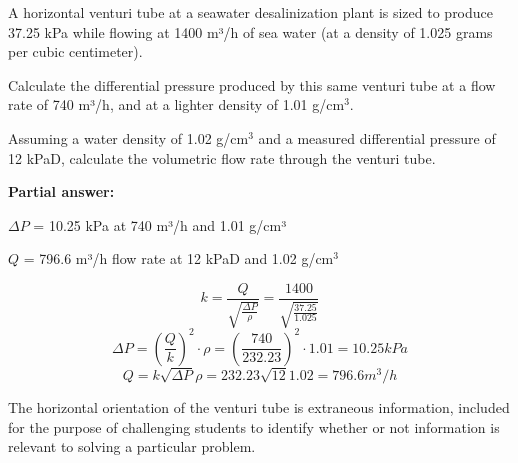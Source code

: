 
A horizontal venturi tube at a seawater desalinization plant is sized to produce 37.25 kPa while flowing at 1400 m³/h of sea water (at a density of 1.025 grams per cubic centimeter).

\vskip 10pt

Calculate the differential pressure produced by this same venturi tube at a flow rate of 740 m³/h, and at a lighter density of 1.01 g/cm$^{3}$.

\vskip 10pt



Assuming a water density of 1.02 g/cm$^{3}$ and a measured differential pressure of 12 kPaD, calculate the volumetric flow rate through the venturi tube.

%







\noindent
{\bf Partial answer:}

\vskip 10pt

$\Delta P$ = 10.25 kPa at 740 m³/h and 1.01 g/cm³


\vskip 10pt

$Q$ = 796.6 m³/h flow rate at 12 kPaD and 1.02 g/cm$^{3}$






$$k=\frac{Q}{\sqrt{\frac{\Delta P}{\rho}}}=\frac{1400}{\sqrt{\frac{37.25}{1.025}}}$$
$$\Delta P=\left(\frac{Q}{k}\right)^2\cdot \rho=\left(\frac{740}{232.23}\right)^2\cdot 1.01=10.25kPa$$
$$Q=k\sqrt{\Delta P}{\rho}=232.23\sqrt{12}{1.02}=796.6 m^3/h$$


The horizontal orientation of the venturi tube is extraneous information, included for the purpose of challenging students to identify whether or not information is relevant to solving a particular problem.




